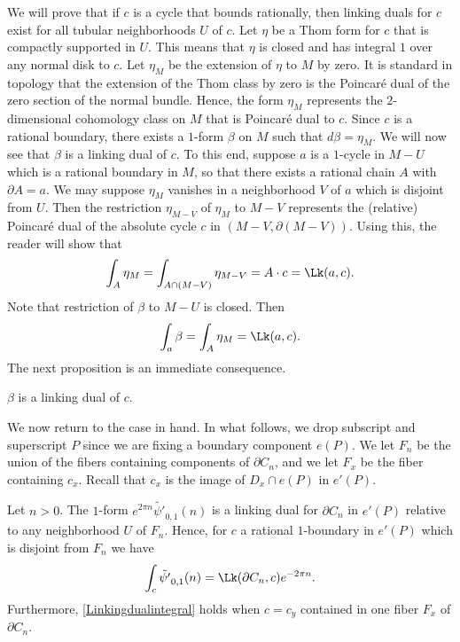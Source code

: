 We will prove that if $c$ is a cycle that bounds rationally, then linking
duals for $c$ exist for all tubular neighborhoods $U$ of $c$. Let $\eta$ be
a Thom form for $c$ that is compactly supported in $U$. This means that
$\eta$ is closed and has integral $1$ over any normal disk to $c$. Let
$\eta_M$ be the extension of $\eta$ to $M$ by zero. It is standard in
topology that the extension of the Thom class by zero is the Poincar\'e dual of
the zero section of the normal bundle. Hence, the form $\eta_M$ represents the
$2$-dimensional cohomology class on $M$ that is Poincar\'e dual to $c$.
Since $c$ is a rational boundary, there exists a $1$-form $\beta$ on $M$ such
that $d \beta = \eta_M$. We will now see that $\beta$ is a linking dual of
$c$. To this end, suppose $a$ is a $1$-cycle in $M - U$ which is a rational
boundary in $M$, so that there exists a rational chain $A$ with $\partial A =
a$. We may suppose $\eta_M$ vanishes in a neighborhood $V$ of $a$ which is
disjoint from $U$. Then the restriction $\eta_{M-V}$ of $\eta_M$ to $M - V$
represents the (relative) Poincar\'e dual of the absolute cycle $c$ in $(M - V,
\partial (M-V))$. Using this, the reader will show that
\begin{equation*} \label{firstequation}
    \int_A \eta_M = \int_{A \cap (M-V)} \eta_{M-V} = A \cdot c = \Lk(a,c).
\end{equation*}
Note that restriction of $\beta$ to $M-U$ is closed. Then
\begin{equation*}
    \int_a \beta = \int_A \eta_M = \Lk(a,c).
\end{equation*}
The next proposition is an immediate consequence.
\begin{proposition} \label{linkingdualprop}
$\beta$ is a linking dual of $c$. 
\end{proposition}


We now return to the case in hand. In what follows, we drop subscript and
superscript $P$ since we are fixing a boundary component $e(P)$. We let
$F_n$ be the union of the fibers containing components of $\partial C_n$, and
we let $F_x$ be the fiber containing $c_x$. Recall that $c_x$ is the image of
$D_x \cap e(P)$ in $e'(P)$.

\begin{theorem}\label{linking-dual}
Let $n>0$. The $1$-form $e^{2 \pi n} \tilde{\psi'}_{0,1}(n)$ is a linking dual for $\partial C_n$ in $e'(P)$ relative to any neighborhood
$U$ of $F_n$. Hence, for $c$ a rational $1$-boundary in $e'(P)$ which is disjoint from $F_n$ we have
\begin{equation}\label{Linkingdualintegral}
\int_c \tilde{\psi'}_{0,1}(n) = \Lk(\partial C_n,c) e^{- 2 \pi n}. 
\end{equation}
Furthermore, \eqref{Linkingdualintegral} holds when $c=c_y$ contained in one fiber $F_x$ of $\partial C_n$.
\end{theorem}

